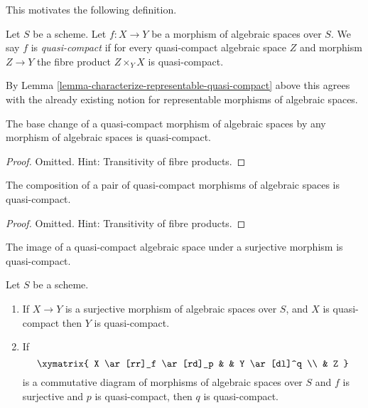 \noindent
This motivates the following definition.

\begin{definition}
\label{definition-quasi-compact}
Let $S$ be a scheme.
Let $f : X \to Y$ be a morphism of algebraic spaces over $S$.
We say $f$ is {\it quasi-compact} if for every quasi-compact
algebraic space $Z$ and morphism $Z \to Y$ the fibre product
$Z \times_Y X$ is quasi-compact.
\end{definition}

\noindent
By Lemma \ref{lemma-characterize-representable-quasi-compact}
above this agrees with the already existing notion
for representable morphisms of algebraic spaces.

\begin{lemma}
\label{lemma-base-change-quasi-compact}
The base change of a quasi-compact morphism of algebraic spaces
by any morphism of algebraic spaces is quasi-compact.
\end{lemma}

\begin{proof}
Omitted. Hint: Transitivity of fibre products.
\end{proof}

\begin{lemma}
\label{lemma-composition-quasi-compact}
The composition of a pair of quasi-compact morphisms of algebraic spaces
is quasi-compact.
\end{lemma}

\begin{proof}
Omitted. Hint: Transitivity of fibre products.
\end{proof}

\begin{lemma}
\label{lemma-surjection-from-quasi-compact}
\begin{slogan}
The image of a quasi-compact algebraic space under a surjective morphism
is quasi-compact.
\end{slogan}
Let $S$ be a scheme.
\begin{enumerate}
\item If $X \to Y$ is a surjective morphism of algebraic spaces over $S$,
and $X$ is quasi-compact then $Y$ is quasi-compact.
\item If
$$
\xymatrix{
X \ar[rr]_f \ar[rd]_p & &
Y \ar[dl]^q \\
& Z
}
$$
is a commutative diagram of morphisms of algebraic spaces over $S$
and $f$ is surjective and $p$ is quasi-compact, then $q$ is quasi-compact.
\end{enumerate}
\end{lemma}

